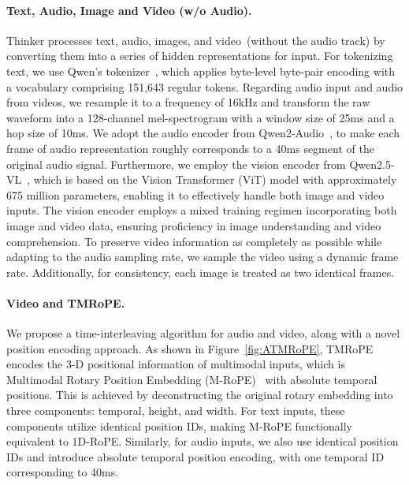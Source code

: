 \paragraph{Text, Audio, Image and Video (w/o Audio).} Thinker processes text, audio, images, and video~(without the audio track) by converting them into a series of hidden representations for input. For tokenizing text, we use Qwen's tokenizer~\citep{qwen2}, which applies byte-level byte-pair encoding with a vocabulary comprising 151,643 regular tokens. Regarding audio input and audio from videos, we resample it to a frequency of 16kHz and transform the raw waveform into a 128-channel mel-spectrogram with a window size of 25ms and a hop size of 10ms. We adopt the audio encoder from Qwen2-Audio~\citep{qwen2-audio}, to make each frame of audio representation roughly corresponds to a 40ms segment of the original audio signal. Furthermore, we employ the vision encoder from Qwen2.5-VL~\citep{bai2025qwen25}, which is based on the Vision Transformer (ViT) model with approximately 675 million parameters, enabling it to effectively handle both image and video inputs. The vision encoder employs a mixed training regimen incorporating both image and video data, ensuring proficiency in image understanding and video comprehension. To preserve video information as completely as possible while adapting to the audio sampling rate, we sample the video using a dynamic frame rate. Additionally, for consistency, each image is treated as two identical frames.

\paragraph{Video and TMRoPE.} 
We propose a time-interleaving algorithm for audio and video, along with a novel position encoding approach. As shown in Figure~\ref{fig:ATMRoPE}, TMRoPE encodes the 3-D positional information of multimodal inputs, which is Multimodal Rotary Position Embedding (M-RoPE)~\citep{qwenvl} with absolute temporal positions. This is achieved by deconstructing the original rotary embedding into three components: temporal, height, and width. For text inputs, these components utilize identical position IDs, making M-RoPE functionally equivalent to 1D-RoPE. Similarly, for audio inputs, we also use identical position IDs and introduce absolute temporal position encoding, with one temporal ID corresponding to 40ms.

